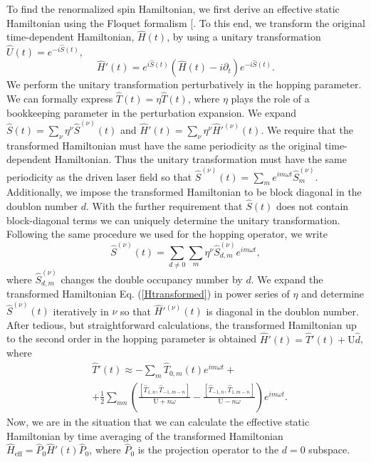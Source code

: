 \documentclass[aps,prl,twocolumn,amsmath,amssymb,nobibnotes]{revtex4-1}%
\renewcommand{\cite}[1]{{[}\onlinecite{#1}{]}}
\newcommand{\n}{\nonumber}
\begin{document}
To find the renormalized spin Hamiltonian, we first derive an effective static Hamiltonian using the Floquet formalism \cite{Floquet1,2018NJPh...20i3022R,Floquet2}. To this end, we transform the original time-dependent Hamiltonian, $\hat{H}(t)$, by using a unitary transformation $\hat{U}(t) = e^{-i\hat{S}(t)}$,
\begin{equation}
\hat{H}'(t) = e^{i\hat{S}(t)} \left(\hat{H}(t)  -  i\partial_t \right) e^{-i\hat{S}(t)}.
\label{Htransformed}
\end{equation}
We perform the unitary transformation perturbatively in the hopping parameter. We can formally express $\hat{T}(t) = \eta \hat{T}(t)$, where $\eta$ plays the role of a bookkeeping parameter in the perturbation expansion. We expand $\hat{S}(t) = \sum_\nu \eta^\nu \hat{S}^{(\nu)}(t)$ and $\hat{H}'(t) = \sum_\nu \eta^\nu \hat{H}'^{(\nu)}(t)$. We require that the transformed Hamiltonian must have the same periodicity as the original time-dependent Hamiltonian. Thus the unitary transformation must have the same periodicity as the driven laser field so that $\hat{S}^{(\nu)}(t) = \sum_m e^{im\omega t}\hat{S}^{(\nu)}_m$. Additionally, we impose the transformed Hamiltonian to be block diagonal in the doublon number $d$. With the further requirement that $\hat{S}(t)$ does not contain block-diagonal terms we can uniquely determine the unitary transformation. Following the same procedure we used for the hopping operator, we write
\begin{equation}
\hat{S}^{(\nu)}(t) = \sum_{d \neq 0} \sum_m \eta^\nu \hat{S}^{(\nu)}_{d,m} e^{im\omega t},
\end{equation}
where $\hat{S}^{(\nu)}_{d,m}$ changes the double occupancy number by $d$. We expand the transformed Hamiltonian Eq. (\ref{Htransformed}) in power series of $\eta$ and determine $\hat{S}^{(\nu)}(t)$ iteratively in $\nu$ so that $\hat{H}'^{(\nu)}(t)$ is diagonal in the doublon number. After tedious, but straightforward calculations, the transformed Hamiltonian up to the second order in the hopping parameter is obtained $\hat{H}'(t)= \hat{T}'(t)+\text{U}\hat{d}$, where
\begin{align}
\label{transformedH}
&\hat{T}'(t) \approx  - \sum_m \hat{T}_{0,m}(t)e^{im\omega t} + \n \\
&+ \frac{1}{2}\sum_{mn} \left( \frac{\left[\hat{T}_{1,n}, \hat{T}_{-1,m-n} \right]}{\text{U}+n\omega} - \frac{\left[\hat{T}_{-1,n}, \hat{T}_{1,m-n} \right]}{\text{U}-n\omega} \right) e^{im\omega t}.
\end{align}
Now, we are in the situation that we can calculate the effective static Hamiltonian by time averaging of the transformed Hamiltonian $\hat{H}_{\text{eff}}=\hat{P}_0\hat{H}'(t)\hat{P}_0$, where $\hat{P}_0$ is the projection operator to the $d=0$ subspace.
\end{document}
